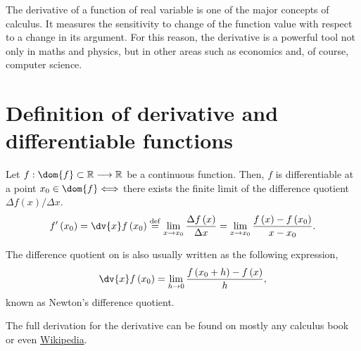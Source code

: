 
The derivative of a function of real variable is one of the major concepts of calculus. It measures the
sensitivity to change of the function value with respect to a change in its argument. For this reason, the
derivative is a powerful tool not only in maths and physics, but in other areas such as economics and, of
course, computer science.

\section{Definition of derivative and differentiable functions}

\begin{defi}[Derivative]\label{def:derivative}
    Let $\appl{f}{\dom{f}\subset \R}{\R}$ be a continuous function. Then, $f$ is differentiable at a point
    $x_0\in \dom{f}\iff$ there exists the finite limit of the difference quotient $\Delta f\left( x \right)
        / \Delta x$.
    \begin{equation}
        f'\left( x_0 \right) = \dv{x} f\left( x_0 \right) \bydef \lim_{x\to x_0} \frac{\Delta f\left( x \right) }{\Delta x} = \lim_{x\to x_0}\frac{f\left( x \right) - f\left( x_0 \right) }{x - x_0}.
    \end{equation}
\end{defi}


\noindent The difference quotient on  is also usually written as the
following expression,
\begin{equation}
    \dv{x} f\left( x_0 \right) = \lim_{h\to 0}\frac{f\left( x_0 + h \right) - f\left( x \right) }{h},
\end{equation}
known as Newton's difference quotient.

The full derivation for the derivative can be found on mostly any calculus book or even \href{https://en.wikipedia.org/wiki/Derivative}{Wikipedia}.

